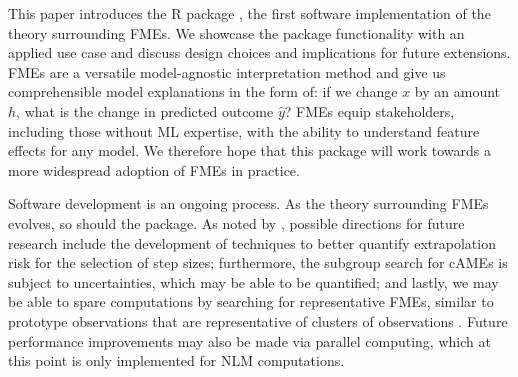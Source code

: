This paper introduces the R package , the first software implementation of the theory surrounding FMEs. We showcase the package functionality with an applied use case and discuss design choices and implications for future extensions. FMEs are a versatile model-agnostic interpretation method and give us comprehensible model explanations in the form of: if we change $x$ by an amount $h$, what is the change in predicted outcome $\widehat{y}$? FMEs equip stakeholders, including those without ML expertise, with the ability to understand feature effects for any model. We therefore hope that this package will work towards a more widespread adoption of FMEs in practice.
\par
Software development is an ongoing process. As the theory surrounding FMEs evolves, so should the  package. As noted by \citet{scholbeck_fme}, possible directions for future research include the development of techniques to better quantify extrapolation risk for the selection of step sizes; furthermore, the subgroup search for cAMEs is subject to uncertainties, which may be able to be quantified; and lastly, we may be able to spare computations by searching for representative FMEs, similar to prototype observations that are representative of clusters of observations \citep{tan_data_mining}. Future performance improvements may also be made via parallel computing, which at this point is only implemented for NLM computations.

\newpage
